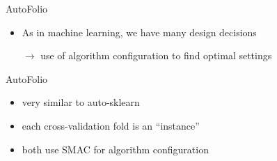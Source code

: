 \begin{frame}[c]{AutoFolio~}

\scalebox{0.55}{

}

\begin{itemize}
  \item As in machine learning, we have many design decisions 
  \item[$\to$] use of algorithm configuration to find optimal settings
\end{itemize}

\end{frame}
\begin{frame}[c]{AutoFolio~}

\scalebox{0.8}{

}

\pause
\medskip 

\begin{itemize}
  \item very similar to auto-sklearn~
  \item each cross-validation fold is an ``instance''
  \item both use SMAC for algorithm configuration 
\end{itemize}


\end{frame}

